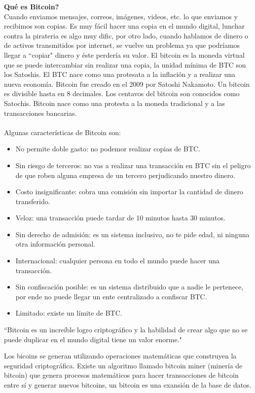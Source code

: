 \documentclass[a4paper,12pt]{lib/pub}
\begin{document}
\textbf{Qué es Bitcoin?}\\
Cuando enviamos mensajes, correos, imágenes, videos, etc. lo que enviamos y recibimos son copias. Es muy fácil hacer una copia en el mundo digital, lunchar contra la pirateria es algo muy dific, por otro lado, cuando hablamos de dinero o de activos transmitidos por internet, se vuelve un problema ya que podríamos llegar a ``copiar" dinero y éste perdería su valor.
El bitcoin es la moneda virtual que se puede intercambiar sin realizar una copia, la unidad mínima de BTC son los Satoshis. El BTC nace como una protesata a la inflación y a realizar una nueva economía.
Bitcoin fue creado en el 2009 por Satoshi Nakamoto. Un bitcoin es divisible hasta en 8 decimales. Los centavos del bitcoin son conocidos como Satochis. Bitcoin nace como una protesta a la moneda tradicional y a las transacciones bancarias.\\\\
Algunas características de Bitcoin son:
\begin{itemize}
\item No permite doble gasto: no podemor realizar copias de BTC.
\item Sin riesgo de terceros: no vas a realizar una transacción en BTC sin el peligro de que roben alguna empresa de un tercero perjudicando nuestro dinero.
\item Costo insignificante: cobra una comisión sin importar la cantidad de dinero transferido.
\item Veloz: una transacción puede tardar de 10 minutos hasta 30 minutos.
\item Sin derecho de admisión: es un sistema inclusivo, no te pide edad, ni ninguna otra información personal.
\item Internacional: cualquier persona en todo el mundo puede hacer una transacción.
\item Sin confiscación posible: es un sistema distribuido que a nadie le pertenece, por ende no puede llegar un ente centralizado a confiscar BTC.
\item Limitado: existe un límite de BTC.
\end{itemize}
``Bitcoin es un increíble logro criptográfico y la habilidad de crear algo que no se puede duplicar en el mundo digital tiene un valor enorme."

Los bicoins se generan utilizando operaciones matemáticas que construyen la seguridad criptográfica. Existe un algoritmo llamado bitcoin miner (minería de bitcoin) que genera procesos matemáticos para hacer transacciones de bitcoin entre sí y generar nuevos bitcoins, un bitcoin es una exansión de la base de datos.
\end{document}
